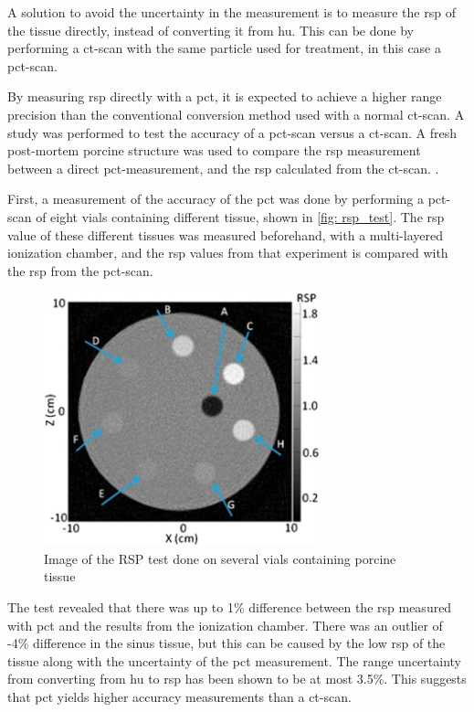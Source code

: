 \documentclass[main.tex]{subfiles}
\begin{document}
A solution to avoid the uncertainty in the measurement is to measure the \gls{rsp} of the tissue directly, instead of converting it from \gls{hu}. This can be done by performing a \gls{ct}-scan with the same particle used for treatment, in this case a \acrfull{pct}-scan. 

By measuring \gls{rsp} directly with a \gls{pct}, it is expected to achieve a higher range precision than the conventional conversion method used with a normal ct-scan. A study was performed to test the accuracy of a \gls{pct}-scan versus a \gls{ct}-scan. A fresh post-mortem porcine structure was used to compare the \gls{rsp} measurement between a direct \gls{pct}-measurement, and the \gls{rsp} calculated from the \gls{ct}-scan.  \cite{porcine_2021}.

First, a measurement of the accuracy of the \gls{pct} was done by performing a \gls{pct}-scan of eight vials containing different tissue, shown in \autoref{fig: rsp_test}. The \gls{rsp} value of these different tissues was measured beforehand, with a multi-layered ionization chamber, and the \gls{rsp} values from that experiment is compared with the \gls{rsp} from the \gls{pct}-scan.

\begin{figure}[!htpb]
    \centering
    \includegraphics[width=8cm ]{images/porcine_phantom.jpg}
    \caption{Image of the RSP test done on several vials containing porcine tissue\cite{porcine_2021}}
    \label{fig: rsp_test}
\end{figure}
\FloatBarrier

The test revealed that there was up to 1\% difference between the \gls{rsp} measured with \gls{pct} and the results from the ionization chamber. There was an outlier of -4\% difference in the sinus tissue, but this can be caused by the low \gls{rsp} of the tissue along with the uncertainty of the \gls{pct} measurement. The range uncertainty from converting from \gls{hu} to \gls{rsp} has been shown to be at most 3.5\%\cite{Paganetti_2012}. This suggests that \gls{pct} yields higher accuracy measurements than a \gls{ct}-scan. 
\end{document}

